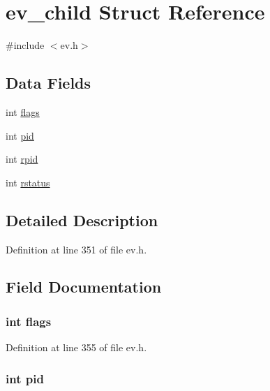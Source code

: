 \hypertarget{structev__child}{\section{ev\-\_\-child \-Struct \-Reference}
\label{structev__child}
}


{\ttfamily \#include $<$ev.\-h$>$}

\subsection*{\-Data \-Fields}
\begin{DoxyCompactItemize}
\item 
int \hyperlink{structev__child_ac8bf36fe0577cba66bccda3a6f7e80a4}{flags}
\item 
int \hyperlink{structev__child_af500917c052066b40cf47f96b43c607b}{pid}
\item 
int \hyperlink{structev__child_afab9955a3bac28037233de894654d9e7}{rpid}
\item 
int \hyperlink{structev__child_ac5fa58bd2072d4433fb143a734f54c1c}{rstatus}
\end{DoxyCompactItemize}


\subsection{\-Detailed \-Description}


\-Definition at line 351 of file ev.\-h.



\subsection{\-Field \-Documentation}
\hypertarget{structev__child_ac8bf36fe0577cba66bccda3a6f7e80a4}{
\subsubsection[{flags}]{\setlength{\rightskip}{0pt plus 5cm}int {\bf flags}}}\label{structev__child_ac8bf36fe0577cba66bccda3a6f7e80a4}


\-Definition at line 355 of file ev.\-h.

\hypertarget{structev__child_af500917c052066b40cf47f96b43c607b}{
\subsubsection[{pid}]{\setlength{\rightskip}{0pt plus 5cm}int {\bf pid}}}\label{structev__child_af500917c052066b40cf47f96b43c607b}


